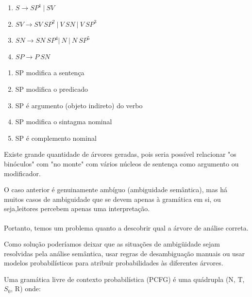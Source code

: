 \begin{enumerate}
  \item $ S \rightarrow SP^1 \ |\ SV $
  \item $ SV \rightarrow SV \ SP^2  \ |\  V \ SN \ |\ V \ SP^3 $
  \item $ SN \rightarrow SN \ SP^4  | \  N \  |  \ N \ SP^5 $
  \item $ SP \rightarrow P \ SN  $
\end{enumerate}

\begin{enumerate}
    \tiny
    \item SP modifica a sentença
    \item SP modifica o predicado
    \item SP é argumento (objeto indireto) do verbo
    \item SP modifica o sintagma nominal
    \item SP é complemento nominal
\end{enumerate}


Existe grande quantidade de árvores geradas, pois seria possível relacionar "os binóculos" com "no monte" com vários núcleos de sentença como argumento ou modificador.


O caso anterior é genuinamente ambíguo (ambiguidade semântica), mas há muitos casos de ambiguidade que se devem apenas à gramática em si, ou seja,leitores percebem apenas uma interpretação.
\\ \\


 Portanto, temos um problema quanto a descobrir qual a árvore de análise correta.

 Como solução poderíamos deixar que as situações de ambigüidade sejam resolvidas pela análise semântica, usar regras de desambiguação manuais ou usar modelos probabilísticos para atribuir probabilidades às diferentes árvores.


 Uma gramática livre de contexto probabilística (PCFG) é uma quádrupla (N, T, $S_0$, R) onde:

